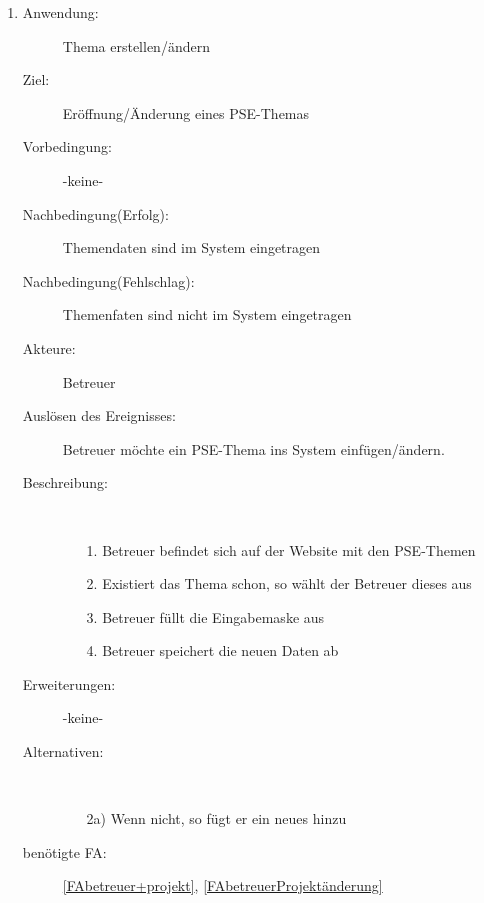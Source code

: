 \documentclass[parskip=full]{scrartcl}
\newcommand{\swtLabel}[1]{\textbf{/#1\arabic*0/}}
\begin{document}
\begin{enumerate} [label=\swtLabel{B}]
  
  \item
	\begin{description}
  		\item[Anwendung:] Thema erstellen/ändern
  		\item[Ziel:] Eröffnung/Änderung eines \gls{PSE}-Themas
  		\item[Vorbedingung:] -keine-
  		\item[Nachbedingung(Erfolg):] Themendaten sind im System eingetragen
  		\item[Nachbedingung(Fehlschlag):] Themenfaten sind nicht im System
  		eingetragen
  		\item[Akteure:] Betreuer
  		\item[Auslösen des Ereignisses:] Betreuer möchte ein \gls{PSE}-Thema ins System
  		einfügen/ändern.
  		\item[Beschreibung:]~
  	\begin{enumerate}
  	  \item[1.] Betreuer befindet sich auf der Website mit den \gls{PSE}-Themen
  	  \item[2.] Existiert das Thema schon, so wählt der Betreuer dieses aus
  	  \item[3.] Betreuer füllt die Eingabemaske aus
  	  \item[4.] Betreuer speichert die neuen Daten ab
  	\end{enumerate}
  	\item[Erweiterungen:] -keine-
  	\item[Alternativen:]~
  	\begin{enumerate}
  	  \item[2a)] Wenn nicht, so fügt er ein neues hinzu
  	\end{enumerate}  
  	\item[benötigte FA:] \ref{FAbetreuer+projekt}, \ref{FAbetreuerProjektänderung}
  \end{description}


\end{enumerate}
\end{document}
